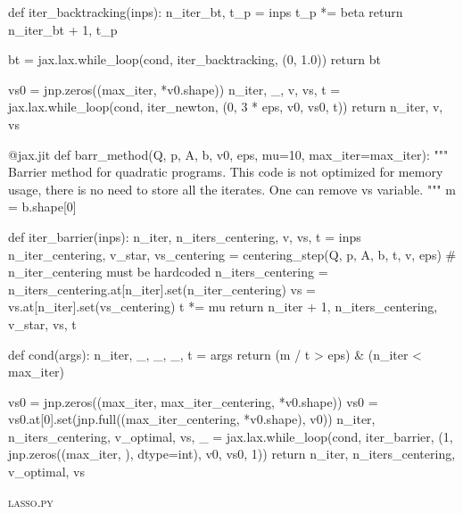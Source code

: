 \documentclass{article}
\begin{document}
\begin{python}
        def iter_backtracking(inps):
            n_iter_bt, t_p = inps
            t_p *= beta
            return n_iter_bt + 1, t_p

        bt = jax.lax.while_loop(cond, iter_backtracking, (0, 1.0))
        return bt

    vs0 = jnp.zeros((max_iter, *v0.shape))
    n_iter, _, v, vs, t = jax.lax.while_loop(cond, iter_newton, (0, 3 * eps, v0, vs0, t))
    return n_iter, v, vs


@jax.jit
def barr_method(Q, p, A, b, v0, eps, mu=10, max_iter=max_iter):
    """
    Barrier method for quadratic programs.
    This code is not optimized for memory usage, there is no need to store all the iterates.
    One can remove vs variable.
    """
    m = b.shape[0]

    def iter_barrier(inps):
        n_iter, n_iters_centering, v, vs, t = inps
        n_iter_centering, v_star, vs_centering = centering_step(Q, p, A, b, t, v,
                                                                eps)  # n_iter_centering must be hardcoded
        n_iters_centering = n_iters_centering.at[n_iter].set(n_iter_centering)
        vs = vs.at[n_iter].set(vs_centering)
        t *= mu
        return n_iter + 1, n_iters_centering, v_star, vs, t

    def cond(args):
        n_iter, _, _, _, t = args
        return (m / t > eps) & (n_iter < max_iter)

    vs0 = jnp.zeros((max_iter, max_iter_centering, *v0.shape))
    vs0 = vs0.at[0].set(jnp.full((max_iter_centering, *v0.shape), v0))
    n_iter, n_iters_centering, v_optimal, vs, _ = jax.lax.while_loop(cond, iter_barrier,
                                                                     (1, jnp.zeros((max_iter, ),
                                                                                  dtype=int), v0, vs0, 1))
    return n_iter, n_iters_centering, v_optimal, vs

\end{python}

\textsc{lasso.py}
\end{document}
